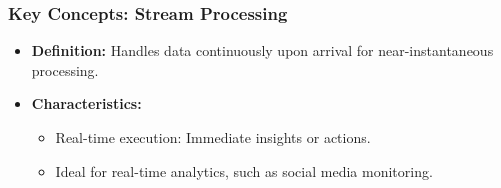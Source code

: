 \documentclass[aspectratio=169]{beamer}
\begin{document}
\begin{frame}[fragile]
    \frametitle{Key Concepts: Stream Processing}
    \begin{itemize}
        \item \textbf{Definition:} Handles data continuously upon arrival for near-instantaneous processing.
        \item \textbf{Characteristics:}
            \begin{itemize}
                \item Real-time execution: Immediate insights or actions.
                \item Ideal for real-time analytics, such as social media monitoring.
            \end{itemize}
    \end{itemize}
\end{frame}
\end{document}
